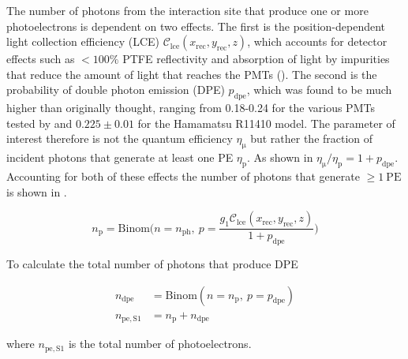 The number of photons from the interaction site that produce one or more photoelectrons is dependent on two effects.  The first is
the position-dependent light collection efficiency (LCE) $\mathcal{C}_{\mathrm{lce}}(x_{\mathrm{rec}}, y_{\mathrm{rec}}, z)$, which
accounts for detector effects such as $<100\%$ PTFE reflectivity and
absorption of light by impurities that reduce the amount of light that reaches the PMTs
().  The second is the probability of double photon emission (DPE) $p_{\mathrm{dpe}}$, which was found
to be much higher than originally thought, ranging from 0.18-0.24 for the various PMTs tested by  and $0.225 \pm 0.01$
for the Hamamatsu R11410 model.  The parameter of interest therefore is not the quantum efficiency $\eta_{\mathrm{\mu}}$ but rather the
fraction of incident photons that generate at least one PE $\eta_{\mathrm{p}}$.  As shown in 
$\eta_{\mathrm{\mu}} / \eta_{\mathrm{p}} = 1 + p_{\mathrm{dpe}}$.  Accounting for both of these effects the number of photons that
generate $\geq 1\ \mathrm{PE}$ is shown in .

\begin{equation}
n_{\mathrm{p}} = \mathrm{Binom} \bigg( n = n_{\mathrm{ph}},\ p =
\frac{g_1 \mathcal{C}_{\mathrm{lce}}(x_{\mathrm{rec}}, y_{\mathrm{rec}}, z)}{1 + p_{\mathrm{dpe}}} \bigg)
\label{eq:er_nr_calibrations_parameter_determ_det_phys_npe}
\end{equation}

To calculate the total number of photons that produce DPE

\begin{subequations}
\begin{align}
n_{\mathrm{dpe}} &= \mathrm{Binom} (n = n_{\mathrm{p}},\ p = p_{\mathrm{dpe}} ) \\
n_{\mathrm{pe,S1}} &= n_{\mathrm{p}} + n_{\mathrm{dpe}}
\end{align}
\label{eq:er_nr_calibrations_parameter_determ_det_phys_num_pe}
\end{subequations}

\noindent where $n_{\mathrm{pe,S1}}$ is the total number of photoelectrons.

